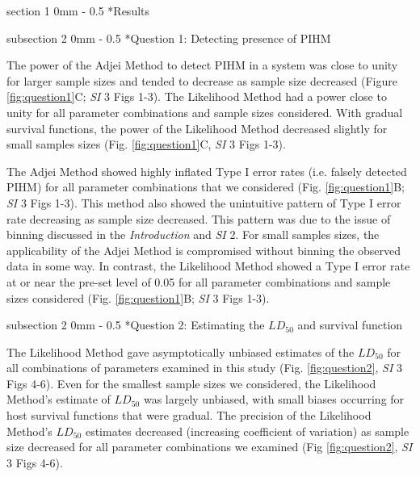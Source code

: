 \documentclass[12pt, a4paper]{article}
\makeatletter
\renewcommand{\section}{\@startsection
{section}%
{1}%
{0mm}%
{-\baselineskip}%
{0.5\baselineskip}%
{\normalfont\bf\large}} %
\renewcommand{\subsection}{\@startsection
{subsection}%
{2}%
{0mm}%
{-\baselineskip}%
{0.5\baselineskip}%
{\normalfont\bf}} %
\makeatother
\begin{document}
\section*{Results}

\subsection*{Question 1: Detecting presence of PIHM}

The power of the Adjei Method to detect PIHM in a
system was close to unity for larger sample sizes and tended to
decrease as sample size decreased (Figure \ref{fig:question1}C; \emph{SI} 3 Figs 1-3).  The Likelihood Method had a power close to
unity for all parameter combinations and sample sizes considered.  With gradual
survival functions, the power of the Likelihood Method decreased slightly for small samples sizes (Fig. \ref{fig:question1}C, \emph{SI} 3 Figs 1-3).

The Adjei Method showed highly inflated Type I error rates (i.e. falsely detected
PIHM) for all parameter combinations that we
considered (Fig. \ref{fig:question1}B; \emph{SI} 3 Figs 1-3).  This method also showed the unintuitive pattern of Type I error
rate decreasing as sample size decreased.  This pattern was due to the issue of
binning discussed in the \emph{Introduction} and \emph{SI} 2. For small samples sizes, the
applicability of the Adjei Method is compromised without binning the observed
data in some way.  In contrast, the Likelihood Method showed a Type I
error rate at or near the pre-set level of 0.05 for all parameter combinations
and sample sizes considered (Fig. \ref{fig:question1}B; \emph{SI} 3 Figs 1-3).

\subsection*{Question 2: Estimating the $LD_{50}$ and survival function}

The Likelihood Method gave asymptotically unbiased estimates of the $LD_{50}$
for all combinations of parameters examined in this study (Fig. \ref{fig:question2}, \emph{SI} 3 Figs 4-6).  Even for
the smallest sample sizes we considered, the Likelihood Method's estimate of $LD_{50}$
was largely unbiased, with small biases occurring for host survival functions
that were gradual. The precision of the Likelihood Method's $LD_{50}$ estimates decreased
(increasing coefficient of variation) as sample size decreased for all
parameter combinations we examined (Fig \ref{fig:question2}, \emph{SI} 3 Figs 4-6).
\end{document}
